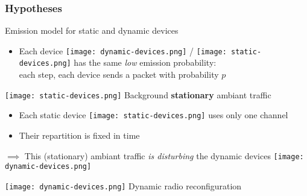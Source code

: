 \subsubsection{Hypotheses}

\begin{frameO}

    \begin{lightblock}{Emission model for static and dynamic devices}

        \begin{itemize}
            \item
                Each device \texttt{[image: dynamic-devices.png]} / \texttt{[image: static-devices.png]}  has the same \emph{low} emission probability: \\
                each step, each device sends a packet with probability \(p\)
        \end{itemize}

    \end{lightblock}

    \vspace*{5pt}
    \pause
    \begin{colorblock}{\texttt{[image: static-devices.png]}  Background \textbf{stationary} ambiant traffic}

        \begin{itemize}
            \item
                  Each static device \texttt{[image: static-devices.png]} uses only one channel
            \item
                  Their repartition is fixed in time
        \end{itemize}

        \(\implies\) This (stationary) ambiant traffic \emph{is disturbing} the dynamic devices \texttt{[image: dynamic-devices.png]}
    \end{colorblock}

    \vspace*{5pt}
    \pause
    \begin{colorblock}{\texttt{[image: dynamic-devices.png]}  Dynamic radio reconfiguration}


\end{colorblock}
\end{frameO}
